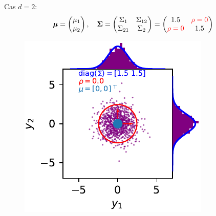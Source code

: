 \documentclass[xcolor=svgnames, t]{beamer}
\newcommand{\vectorx}[1]{\boldsymbol{\MakeLowercase{\mathbf{#1}}}}
\newcommand{\matrixx}[1]{\boldsymbol{\MakeUppercase{#1}}}
\begin{document}
\begin{frame}{\subsecname}
  Cas $d=2$:
  \begin{equation*}
    \vectorx{\mu}
    =
    \begin{pmatrix}
      \mu_1 \\
      \mu_2
    \end{pmatrix},
    \quad
    \matrixx{\Sigma}
    =
      \begin{pmatrix}
        \Sigma_{1} & \Sigma_{12} \\
        \Sigma_{21} & \Sigma_{2}
      \end{pmatrix}
    =
      \begin{pmatrix}
        1.5 & \color{red}\rho = 0 \\
        \color{red}\rho = 0 & 1.5
      \end{pmatrix}
  \end{equation*}
% 
  \begin{figure}
    \includegraphics{gaussian_2d_rho_null.pdf}
  \end{figure}
\end{frame}
\end{document}
